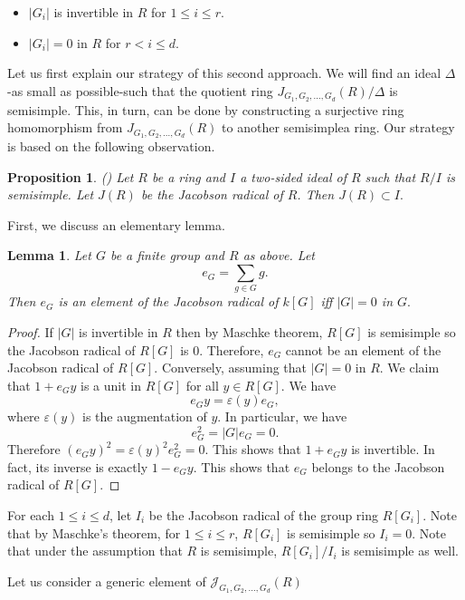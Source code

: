 \documentclass[12pt, a4paper]{amsart}
\numberwithin{equation}{section} %
\theoremstyle{plain}
\theoremstyle{definition}
\theoremstyle{plain}
\newtheorem{prop}[thm]{Proposition}
\newtheorem{lem}[thm]{Lemma}
\theoremstyle{remark}
\newcommand{\sJ}{\mathcal{J}}
\begin{document}
\begin{itemize}
    \item $|G_i|$ is invertible in $R$ for $1 \leq i \leq r$. 
    \item $|G_i|=0$ in $R$ for $r < i \leq d$.
\end{itemize}
Let us first explain our strategy of this second approach. We will find an ideal $\Delta$ -as small as possible-such that the quotient ring $J_{G_1, G_2, \ldots, G_d}(R)/\Delta$ is semisimple. This, in turn, can be done by constructing a surjective ring homomorphism from $J_{G_1, G_2, \ldots, G_d}(R)$ to another semisimplea ring. Our strategy is based on the following observation. 
\begin{prop} (\cite[Section 4.3, Lemma b]{pierce1982associative})
Let $R$ be a ring and $I$ a two-sided ideal of $R$ such that $R/I$ is semisimple. Let $J(R)$ be the Jacobson radical of $R$. Then $J(R) \subset I.$
\end{prop}
First, we discuss an elementary lemma. 
\begin{lem}
Let $G$ be a finite group and $R$ as above. Let 
\[ e_{G}=\sum_{g \in G} g.\] 
Then $e_G$ is an element of the Jacobson radical of $k[G]$ iff $|G|=0$ in $G.$
\end{lem}
\begin{proof}
If $|G|$ is invertible in $R$ then by Maschke theorem, $R[G]$ is semisimple so the Jacobson radical of $R[G]$ is $0$. Therefore, $e_G$ cannot be an element of the Jacobson radical of $R[G].$ Conversely, assuming that $|G|=0$ in $R.$ We claim that $1+e_G y$ is a unit in $R[G]$ for all $y \in R[G].$  We have 
\[ e_G y =\varepsilon(y) e_G, \]
where $\varepsilon(y)$ is the augmentation of $y$. In particular, we have 
\[ e_G^2= |G| e_G=0 .\] 
Therefore $(e_Gy)^2=\varepsilon(y)^2 e_G^2=0.$ This shows that $1+e_G y$ is invertible. In fact, its inverse is exactly $1-e_Gy.$
This shows that $e_G$ belongs to the Jacobson radical of $R[G].$
\end{proof}
For each $1 \leq i \leq d$, let $I_i$ be the Jacobson radical of the group ring $R[G_i].$ Note that by Maschke's theorem, for $1 \leq i \leq r$, $R[G_i]$ is semisimple so $I_i=0$. Note that under the assumption that $R$ is semisimple, $R[G_i]/I_i$ is semisimple as well. 


Let us consider a generic element of $\sJ_{G_1, G_2, \ldots, G_d}(R)$ 
\end{document}
